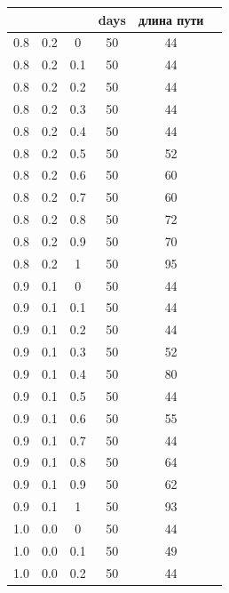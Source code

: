 \documentclass[12pt]{report}
\begin{document}
\begin{table}[!h]
	\begin{center}
		\begin{tabular}{c@{\hspace{7mm}}c@{\hspace{7mm}}c@{\hspace{7mm}}c@{\hspace{7mm}}c@{\hspace{7mm}}c}
			\toprule
			\alpha        & \beta      & \rho      &days &длина пути \\
			\midrule
			0.8     &0.2    &0      &50    &44\\
			0.8     &0.2    &0.1    &50    &44\\
			0.8     &0.2    &0.2    &50    &44\\
			0.8     &0.2    &0.3    &50    &44\\
			0.8     &0.2    &0.4    &50    &44\\
			0.8     &0.2    &0.5    &50    &52\\
			0.8     &0.2    &0.6    &50    &60\\
			0.8     &0.2    &0.7    &50    &60\\
			0.8     &0.2    &0.8    &50    &72\\
			0.8     &0.2    &0.9    &50    &70\\
			0.8     &0.2    &1      &50     &95\\
			\midrule
			0.9     &0.1    &0      &50    &44\\
			0.9     &0.1    &0.1    &50    &44\\
			0.9     &0.1    &0.2    &50    &44\\
			0.9     &0.1    &0.3    &50    &52\\
			0.9     &0.1    &0.4    &50    &80\\
			0.9     &0.1    &0.5    &50    &44\\
			0.9     &0.1    &0.6    &50    &55\\
			0.9     &0.1    &0.7    &50    &44\\
			0.9     &0.1    &0.8    &50    &64\\
			0.9     &0.1    &0.9    &50   &62\\
			0.9     &0.1    &1      &50    &93\\
			\midrule
			1.0     &0.0    &0      &50    &44\\
			1.0     &0.0    &0.1    &50    &49\\
			1.0     &0.0    &0.2    &50    &44\\

\end{tabular}
\end{center}
\end{table}
\end{document}
